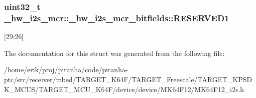 \subsubsection[{\texorpdfstring{R\+E\+S\+E\+R\+V\+E\+D1}{RESERVED1}}]{\setlength{\rightskip}{0pt plus 5cm}uint32\+\_\+t \+\_\+hw\+\_\+i2s\+\_\+mcr\+::\+\_\+hw\+\_\+i2s\+\_\+mcr\+\_\+bitfields\+::\+R\+E\+S\+E\+R\+V\+E\+D1}\hypertarget{struct__hw__i2s__mcr_1_1__hw__i2s__mcr__bitfields_a0086e6ae6037c1f2ba857661964fbc56}{}\label{struct__hw__i2s__mcr_1_1__hw__i2s__mcr__bitfields_a0086e6ae6037c1f2ba857661964fbc56}
\mbox{[}29\+:26\mbox{]} 

The documentation for this struct was generated from the following file\+:\begin{DoxyCompactItemize}
\item 
/home/erik/proj/piranha/code/piranha-\/ptc/src/receiver/mbed/\+T\+A\+R\+G\+E\+T\+\_\+\+K64\+F/\+T\+A\+R\+G\+E\+T\+\_\+\+Freescale/\+T\+A\+R\+G\+E\+T\+\_\+\+K\+P\+S\+D\+K\+\_\+\+M\+C\+U\+S/\+T\+A\+R\+G\+E\+T\+\_\+\+M\+C\+U\+\_\+\+K64\+F/device/device/\+M\+K64\+F12/M\+K64\+F12\+\_\+i2s.\+h\end{DoxyCompactItemize}
